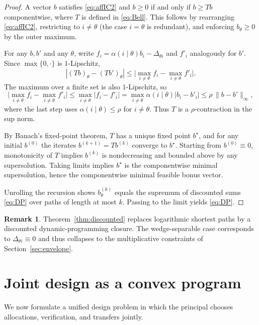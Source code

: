 \documentclass[final,3p,times]{elsarticle}
\theoremstyle{plain}
\theoremstyle{definition}
\newtheorem{remark}{Remark}
\newcommand{\1}{\mathbbm{1}}
\begin{document}
\begin{proof}
A vector $b$ satisfies \eqref{eq:affIC2} and $b\ge 0$ if and only if $b\ge Tb$ componentwise, where $T$ is defined in \eqref{eq:Bell}. This follows by rearranging \eqref{eq:affIC2}, restricting to $i\neq\theta$ (the case $i=\theta$ is redundant), and enforcing $b_\theta\ge 0$ by the outer maximum.

For any $b,b'$ and any $\theta$, write $f_i=\alpha(i\mid\theta)b_i-\Delta_{\theta i}$ and $f'_i$ analogously for $b'$. Since $\max\{0,\cdot\}$ is $1$-Lipschitz,
\[
|(Tb)_\theta-(Tb')_\theta|
\le \big|\max_{i\neq\theta} f_i - \max_{i\neq\theta} f'_i\big|.
\]
The maximum over a finite set is also $1$-Lipschitz, so
\[
\big|\max_{i\neq\theta} f_i - \max_{i\neq\theta} f'_i\big|
\le \max_{i\neq\theta}|f_i-f'_i|
= \max_{i\neq\theta}\alpha(i\mid\theta)|b_i-b'_i|
\le \rho\,\|b-b'\|_\infty,
\]
where the last step uses $\alpha(i\mid\theta)\le\rho$ for $i\neq\theta$. Thus $T$ is a $\rho$-contraction in the sup norm.

By Banach's fixed-point theorem, $T$ has a unique fixed point $b^\star$, and for any initial $b^{(0)}$ the iterates $b^{(k+1)}=Tb^{(k)}$ converge to $b^\star$. Starting from $b^{(0)}\equiv 0$, monotonicity of $T$ implies $b^{(k)}$ is nondecreasing and bounded above by any supersolution. Taking limits implies $b^\star$ is the componentwise minimal supersolution, hence the componentwise minimal feasible bonus vector.

Unrolling the recursion shows $b^{(k)}_\theta$ equals the supremum of discounted sums \eqref{eq:DP} over paths of length at most $k$. Passing to the limit yields \eqref{eq:DP}. 
\end{proof}

\begin{remark}
Theorem~\ref{thm:discounted} replaces logarithmic shortest paths by a discounted dynamic-programming closure. The wedge-separable case corresponds to $\Delta_{\theta i}\equiv 0$ and thus collapses to the multiplicative constraints of Section~\ref{sec:envelope}.
\end{remark}

\section{Joint design as a convex program}\label{sec:convex}

We now formulate a unified design problem in which the principal chooses allocations, verification, and transfers jointly.
\end{document}

